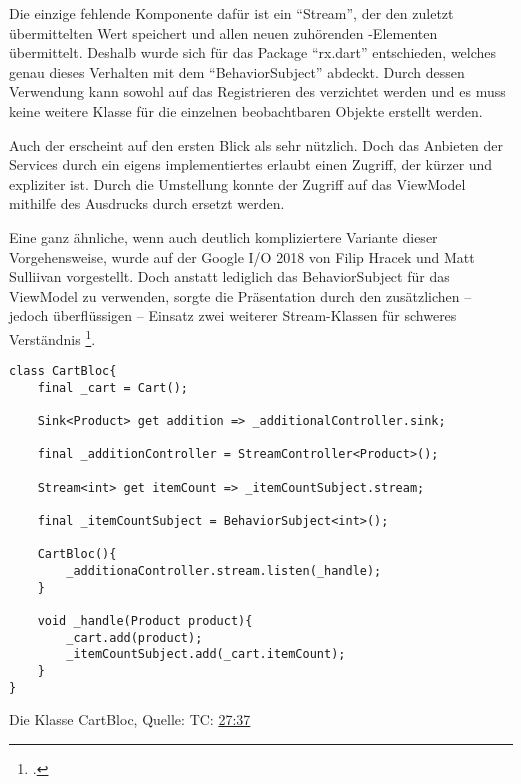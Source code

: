 Die einzige fehlende Komponente dafür ist ein \enquote{Stream},
der den zuletzt übermittelten Wert speichert und allen neuen zuhörenden -Elementen übermittelt.
Deshalb wurde sich für das Package \enquote{rx.dart} entschieden,
welches genau dieses Verhalten mit dem \enquote{BehaviorSubject} abdeckt.
Durch dessen Verwendung kann sowohl auf das Registrieren des  verzichtet werden
und es muss keine weitere Klasse für die einzelnen beobachtbaren Objekte erstellt werden.

Auch der  erscheint auf den ersten Blick als sehr nützlich.
Doch das Anbieten der Services durch ein eigens implementiertes  erlaubt einen Zugriff,
der kürzer und expliziter ist.
Durch die Umstellung konnte der Zugriff auf das ViewModel mithilfe des Ausdrucks  durch  ersetzt werden.

Eine ganz ähnliche, wenn auch deutlich kompliziertere Variante dieser Vorgehensweise, wurde auf der Google I/O 2018 von Filip Hracek und Matt Sulliivan vorgestellt. Doch anstatt lediglich das BehaviorSubject für das ViewModel zu verwenden, sorgte die Präsentation durch den zusätzlichen -- jedoch überflüssigen -- Einsatz zwei weiterer Stream-Klassen für schweres Verständnis \Lst{\ref{lst:CartBloc}}\footcite[][TC: \href{https://youtu.be/RS36gBEp8OI?t=1657}{27:37}]{GoogleIO18}.

\ifIncludeFigures
  \begin{listing}[h]
    \begin{verbatim}
class CartBloc{
    final _cart = Cart();

    Sink<Product> get addition => _additionalController.sink;

    final _additionController = StreamController<Product>();

    Stream<int> get itemCount => _itemCountSubject.stream;

    final _itemCountSubject = BehaviorSubject<int>();

    CartBloc(){
        _additionaController.stream.listen(_handle);
    }

    void _handle(Product product){
        _cart.add(product);
        _itemCountSubject.add(_cart.itemCount);
    }
}
\end{verbatim}
    \caption[Die Klasse CartBloc]{Die Klasse CartBloc, Quelle: \cite{GoogleIO18} TC: \href{https://youtu.be/RS36gBEp8OI?t=1657}{27:37} \footnotemark}
    \label{lst:CartBloc}
  \end{listing}
\fi

